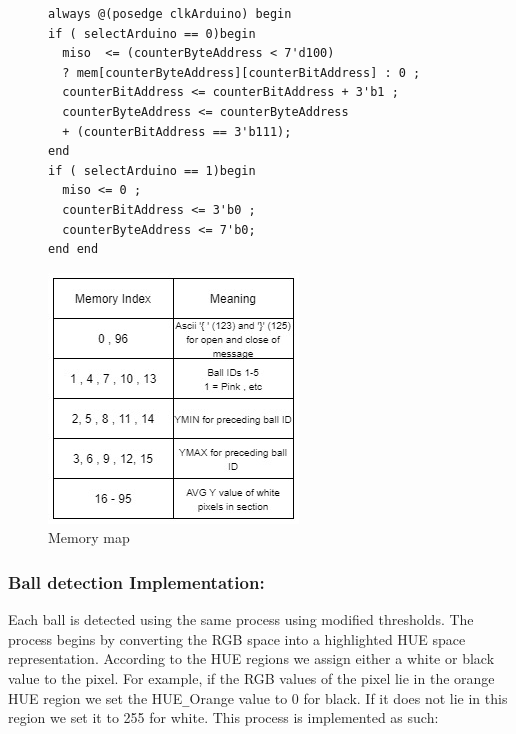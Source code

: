 \documentclass[10pt,twoside]{article}
\begin{document}
\begin{figure}[hbt]
\begin{minipage}{.56\textwidth}
\begin{verbatim}
always @(posedge clkArduino) begin
if ( selectArduino == 0)begin
  miso  <= (counterByteAddress < 7'd100) 
  ? mem[counterByteAddress][counterBitAddress] : 0 ;
  counterBitAddress <= counterBitAddress + 3'b1 ;
  counterByteAddress <= counterByteAddress 
  + (counterBitAddress == 3'b111);
end    
if ( selectArduino == 1)begin
  miso <= 0 ;
  counterBitAddress <= 3'b0 ;
  counterByteAddress <= 7'b0;
end end
\end{verbatim}
\end{minipage}
\begin{minipage}{.43\textwidth}
        \includegraphics[scale = 0.4]{memoryMap.jpg}
            \centering
            \caption{Memory map}
            \label{fig:InitalDesign}
\end{minipage}
\end{figure}



\subsubsection{Ball detection Implementation:}

Each ball is detected using the same process using modified thresholds. The process begins by converting the RGB space into a highlighted HUE space representation. According to the HUE regions we assign either a white or black value to the pixel. For example, if the RGB values of the pixel lie in the orange HUE region we set the HUE\verb|_|Orange value to 0 for black. If it does not lie in this region we set it to 255 for white. This process is implemented as such:
\end{document}
